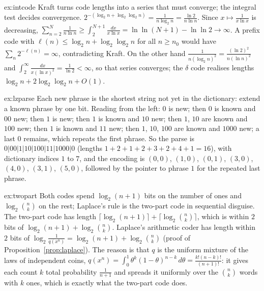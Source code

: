 \begin{solution}{ex:intcode}
\idea Kraft turns code lengths into a series that must converge; the integral test decides convergence.
\writeup $2^{-(\log_2n+\log_2\log_2n)}=\frac1{n\log_2n}=\frac{\ln2}{n\ln n}$. Since $x\mapsto\frac1{x\ln x}$ is decreasing, $\sum_{n=2}^N\frac1{n\ln n}\ge\int_2^{N+1}\frac{dx}{x\ln x}=\ln\ln(N+1)-\ln\ln2\to\infty$. A prefix code with $\ell(n)\le\log_2n+\log_2\log_2n$ for all $n\ge n_0$ would have $\sum_n2^{-\ell(n)}=\infty$, contradicting Kraft. On the other hand $\frac1{n(\log_2n)^2}=\frac{(\ln2)^2}{n(\ln n)^2}$ and $\int_2^\infty\frac{dx}{x(\ln x)^2}=\frac1{\ln2}<\infty$, so that series converges; the $\delta$ code realises lengths $\log_2n+2\log_2\log_2n+O(1)$.
\end{solution}

\begin{solution}{ex:lzparse}
\idea Each new phrase is the shortest string not yet in the dictionary: extend a known phrase by one bit.
\writeup Reading from the left: $0$ is new; then $0$ is known and $00$ new; then $1$ is new; then $1$ is known and $10$ new; then $1$, $10$ are known and $100$ new; then $1$ is known and $11$ new; then $1$, $10$, $100$ are known and $1000$ new; a last $0$ remains, which repeats the first phrase. So the parse is $0|00|1|10|100|11|1000|0$ (lengths $1+2+1+2+3+2+4+1=16$), with dictionary indices $1$ to $7$, and the encoding is $(0,0)$, $(1,0)$, $(0,1)$, $(3,0)$, $(4,0)$, $(3,1)$, $(5,0)$, followed by the pointer to phrase $1$ for the repeated last phrase.
\end{solution}

\begin{solution}{ex:twopart}
\idea Both codes spend $\log_2(n+1)$ bits on the number of ones and $\log_2\binom nk$ on the rest; Laplace's rule is the two-part code in sequential disguise.
\writeup The two-part code has length $\lceil\log_2(n+1)\rceil+\lceil\log_2\binom nk\rceil$, which is within $2$ bits of $\log_2(n+1)+\log_2\binom nk$. Laplace's arithmetic coder has length within $2$ bits of $\log_2\frac1{q(x^n)}=\log_2(n+1)+\log_2\binom nk$ (proof of Proposition~\ref{prop:laplace}). The reason is that $q$ is the uniform mixture of the laws of independent coins, $q(x^n)=\int_0^1\theta^k(1-\theta)^{n-k}\,d\theta=\frac{k!(n-k)!}{(n+1)!}$: it gives each count $k$ total probability $\frac1{n+1}$ and spreads it uniformly over the $\binom nk$ words with $k$ ones, which is exactly what the two-part code does.
\end{solution}

